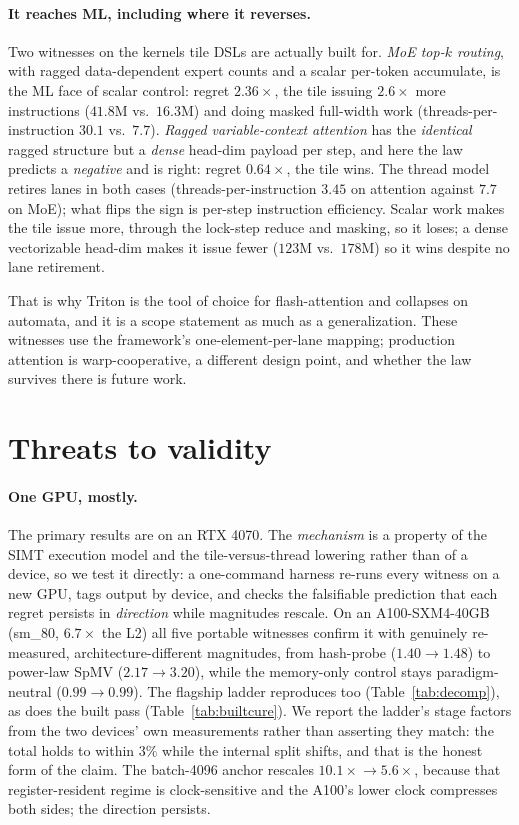 \documentclass[sigplan,screen,review]{acmart}
\begin{document}
\paragraph{It reaches ML, including where it reverses.} Two witnesses on the kernels tile
DSLs are actually built for. \emph{MoE top-$k$ routing}, with ragged data-dependent expert
counts and a scalar per-token accumulate, is the ML face of scalar control: regret
$2.36\times$, the tile issuing $2.6\times$ more instructions ($41.8$M vs.\ $16.3$M) and
doing masked full-width work (threads-per-instruction $30.1$ vs.\ $7.7$).
\emph{Ragged variable-context attention} has the \emph{identical} ragged structure but a
\emph{dense} head-dim payload per step, and here the law predicts a \emph{negative} and is
right: regret $0.64\times$, the tile wins. The thread model retires lanes in both cases
(threads-per-instruction $3.45$ on attention against $7.7$ on MoE); what flips the sign is
per-step instruction efficiency. Scalar work makes the tile issue
more, through the lock-step reduce and masking, so it loses; a dense vectorizable head-dim
makes it issue fewer ($123$M vs.\ $178$M) so it wins despite no lane retirement.

That is why Triton is the tool of choice for flash-attention and collapses on automata, and
it is a scope statement as much as a generalization. These witnesses use the framework's
one-element-per-lane mapping; production attention is warp-cooperative, a different design
point, and whether the law survives there is future work.

\section{Threats to validity}\label{sec:threats}

\paragraph{One GPU, mostly.} The primary results are on an RTX 4070. The \emph{mechanism}
is a property of the SIMT execution model and the tile-versus-thread lowering rather than
of a device, so we test it directly: a one-command harness re-runs every witness on a new
GPU, tags output by device, and checks the falsifiable prediction that each regret persists
in \emph{direction} while magnitudes rescale. On an A100-SXM4-40GB (sm\_80, $6.7\times$ the
L2) all five portable witnesses confirm it with genuinely re-measured, architecture-different
magnitudes, from hash-probe ($1.40\!\to\!1.48$) to power-law SpMV
($2.17\!\to\!3.20$), while the memory-only control stays paradigm-neutral
($0.99\!\to\!0.99$). The flagship ladder reproduces too
(Table~\ref{tab:decomp}), as does the built pass (Table~\ref{tab:builtcure}). We report
the ladder's stage factors from the two devices' own measurements rather than asserting
they match: the total holds to within $3\%$ while the internal split shifts, and that is
the honest form of the claim. The
batch-4096 anchor rescales $10.1\times\!\to\!5.6\times$, because that register-resident
regime is clock-sensitive and the A100's lower clock compresses both sides; the direction
persists.
\end{document}
